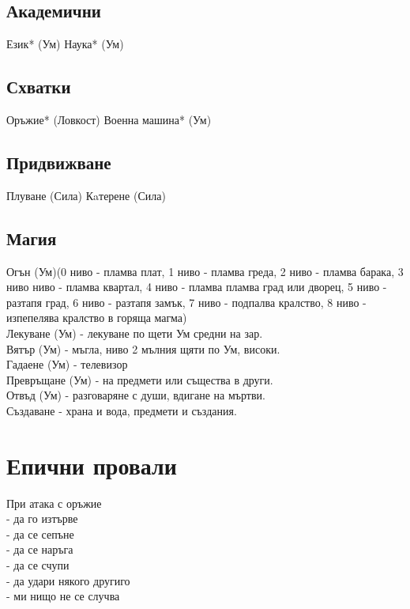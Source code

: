 \subsection{Академични}
Език* (Ум)
Наука* (Ум)

\subsection{Схватки}
Оръжие* (Ловкост)
Военна машина* (Ум)

\subsection{Придвижване}
Плуване (Сила)
Кaтерене (Сила)

\subsection{Магия}
Огън (Ум)(0 ниво - пламва плат, 1 ниво - пламва греда, 2 ниво - пламва барака, 3 ниво ниво - пламва квартал, 4 ниво - пламва пламва град или дворец, 5 ниво - разтапя град, 6 ниво - разтапя замък, 7 ниво - подпалва кралство, 8 ниво - изпепелява кралство в горяща магма) \\
Лекуване (Ум) - лекуване по щети Ум средни на зар.      \\
Вятър (Ум) - мъгла, ниво 2 мълния щяти по Ум, високи.   \\
Гадаене (Ум) - телевизор                                \\
Превръщане (Ум) - на предмети или същества в други.     \\
Отвъд (Ум) - разговаряне с души, вдигане на мъртви.     \\
Създаване - храна и вода, предмети и създания.          \\

\section{Епични провали}
При атака с оръжие           \\
- да го изтърве              \\
- да се сепъне               \\
- да се наръга               \\
- да се счупи                \\
- да удари някого другиго    \\
- ми нищо не се случва       \\
